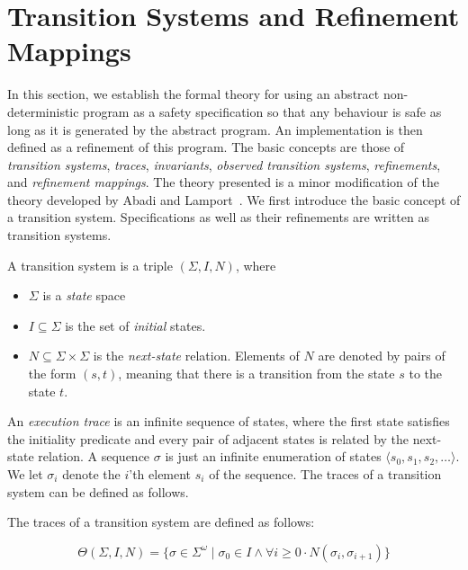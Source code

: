 
\section{Transition Systems and Refinement Mappings}
\label{transition-systems}

In this section,  we establish the  formal theory for using an abstract
non-deterministic program as   a safety specification so  that any
behaviour is safe as long as it is generated by the abstract program.  An implementation
is then defined as  a refinement of  this program.  The basic concepts
are those of {\em transition systems}, {\em traces}, {\em invariants},
{\em  observed  transition   systems},   {\em refinements},   and {\em
  refinement mappings}.  The  theory presented is a minor modification
of the theory developed by Abadi and Lamport~\cite{AL:Mappings}.     
We first introduce   the basic concept of  a
transition system.  Specifications as  well as their refinements
are written as transition systems.

\begin{definition}
A transition system is a triple $(\Sigma,I,N)$, where

\begin{itemize}

  \item $\Sigma$ is a {\em state} space

  \item $I \subseteq \Sigma$ is the set of {\em initial} states.

  \item $N \subseteq \Sigma \times \Sigma$ is the {\em next-state} relation.
        Elements of $N$ are denoted by pairs of the form $(s,t)$, meaning that
        there is a transition from the state $s$ to the state $t$.

\end{itemize}
\end{definition}

\noindent
An {\em execution trace\/}  is an infinite sequence of
states,  where  the first state  satisfies  the initiality predicate and
every pair  of adjacent states is  related  by the  next-state
relation.  A 
sequence $\sigma$  is just an infinite enumeration  of states $\langle s_0,
s_1,  s_2, \ldots \rangle$.     We  let $\sigma_i$ denote  the  $i$'th
element $s_i$  of the  sequence.    The traces of   a transition
system can be defined as follows.

\begin{definition}[Traces]
\label{def-traces}
  The traces of a transition system are defined as follows:

\[
\Theta(\Sigma,I,N) = \{ \sigma \in \Sigma^{\omega} \mid 
                          \sigma_0 \in I \wedge
                          \forall i \ge 0 \cdot N(\sigma_i,\sigma_{i+1}) \}
\] 
\end{definition}

